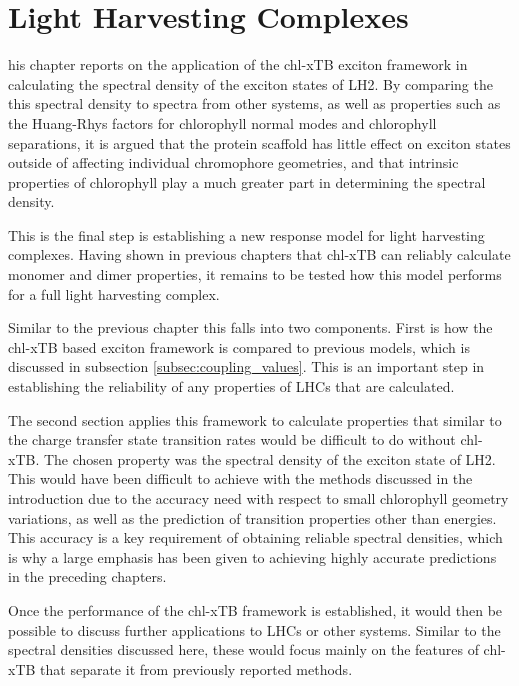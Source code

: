 %
%
\let\textcircled=\pgftextcircled
\chapter{Light Harvesting Complexes}
\label{chap:LH2}

his chapter reports on the application of the chl-xTB exciton framework
in calculating the spectral density of the exciton states of LH2. By comparing the
this spectral density to spectra from other systems, as well as properties such
as the Huang-Rhys factors for chlorophyll normal modes and chlorophyll separations,
it is argued that the protein scaffold has little effect on exciton states outside
of affecting individual chromophore geometries, and that intrinsic properties of
chlorophyll play a much greater part in determining the spectral density.

This is the final step is establishing a new response model for light harvesting
complexes. Having shown in previous chapters that chl-xTB can reliably calculate 
monomer and dimer properties, it remains to be tested how this model performs for
a full light harvesting complex.

Similar to the previous chapter this falls into two components. First is how the
chl-xTB based exciton framework is compared to previous models, which is discussed
in subsection \ref{subsec:coupling_values}. This is an important step in establishing
the reliability of any properties of LHCs that are calculated.

The second section applies this framework to calculate properties that similar to 
the charge transfer state transition rates would be difficult to do without chl-xTB.
The chosen property was the spectral density of the exciton state of LH2. This would
have been difficult to achieve with the methods discussed in the introduction due
to the accuracy need with respect to small chlorophyll geometry variations, as well
as the prediction of transition properties other than \Qy energies. This accuracy
is a key requirement of obtaining reliable spectral densities, which is why a large
emphasis has been given to achieving highly accurate predictions in the preceding
chapters.

Once the performance of the chl-xTB framework is established, it would then be possible
to discuss further applications to LHCs or other systems. Similar to the spectral
densities discussed here, these would focus mainly on the features of chl-xTB that
separate it from previously reported methods.

